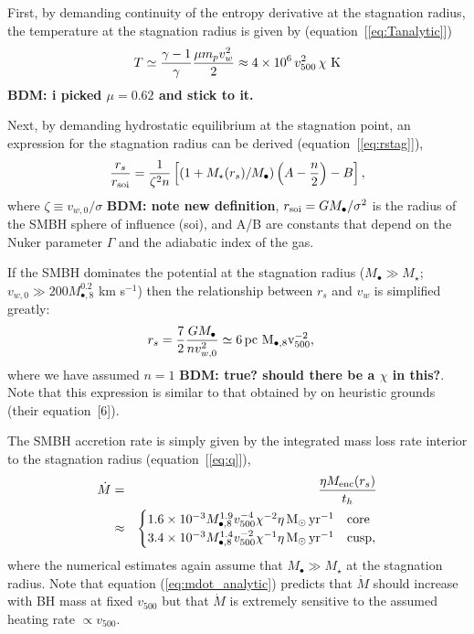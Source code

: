 \documentclass[usenatbib,fleqn]{mn2e}
\newcommand{\rs}{r_s}
\newcommand{\pc}{\rm pc}
\newcommand{\Menc}{M_{\rm enc}}
\newcommand{\Mstar}{M_{\star}}
\newcommand{\Mbh}[1][]{M_{\bullet#1}}
\newcommand{\Mbheight}{M_{\bullet,8}}
\newcommand{\soi}{\rm soi}
\newcommand{\rsoi}{r_{\soi}}
\newcommand{\vwO}{v_{w,0}}
\newcommand{\x}{\frac{r_s}{\rsoi}}
\newcommand{\pyear}{{\rm yr}^{-1}}
\renewcommand{\th}{t_h}
\begin{document}
First, by demanding continuity of the entropy derivative at the stagnation radius, the temperature at the stagnation radius is given by (equation~[\ref{eq:Tanalytic}])
\begin{align}
T \simeq \frac{\gamma-1}{\gamma}\frac{\mu m_p v_{w}^{2}}{2} \approx 4 \times 10^6\,v_{500}^2 \, \chi   \,\,{\rm K} 
\end{align}
{\bf BDM: i picked $\mu = 0.62$ and stick to it.}

Next, by demanding hydrostatic equilibrium at the stagnation point, an expression for the stagnation radius can be derived (equation~[\ref{eq:rstag}]),
\begin{align}
  \x=\frac{1}{\zeta^2 n}\left[ (1+\Mstar(\rs)/\Mbh)\left(A-\frac{n}{2}\right)-B\right],
  \label{eq:stag_analytic}
\end{align}
where $\zeta \equiv v_{w,0}/\sigma$ {\bf BDM: note new definition}, $r_{\rm soi} = GM_{\bullet}/\sigma^{2}$ is the radius of the SMBH sphere of influence (soi), and A/B are constants that depend on the Nuker parameter $\Gamma$ and the adiabatic index of the gas.  

If the SMBH dominates the potential at the stagnation radius
($M_{\bullet} \gg M_{\star}$; $v_{w,0} \gg 200 M_{\bullet,8}^{0.2}$ km
s$^{-1}$) then the relationship between $\rs$ and $v_{w}$ is
simplified greatly:
\begin{align}
  &\rs=\frac{7}{2}\frac{G \Mbh}{n \vwO^2} \simeq 6 \, \pc \,\, \Mbheight v_{500}^{-2},
  \label{eq:stag_simple}
\end{align}
where we have assumed $n = 1$ {\bf BDM: true?  should there be a
  $\chi$ in this?}.  Note that this expression is similar to that
obtained by \citet{Volonteri+11} on heuristic grounds (their equation~[6]).

The SMBH accretion rate is simply given by the integrated mass loss rate interior to the stagnation radius (equation~[\ref{eq:q}]), 
\begin{eqnarray}
  \dot{M} &=& \frac{\eta \Menc(\rs)}{\th} \nonumber \\
&\approx&
  \begin{cases}
    1.6 \times 10^{-3}  M_{\bullet,8}^{1.9}
    v_{500}^{-4} \chi^{-2} \eta \Msun \, \pyear& \text{core} \\
    3.4 \times 10^{-3} \Mbheight^{1.4}
    v_{500}^{-2} \chi^{-1} \eta \Msun \, \pyear  & \text{cusp}, 
  \end{cases}
  \label{eq:mdot_analytic}
\end{eqnarray}
where the numerical estimates again assume that $M_{\bullet} \gg M_{\star}$ at the stagnation radius.  Note that equation (\ref{eq:mdot_analytic}) predicts that $\dot{M}$ should increase with BH mass at fixed $v_{500}$ but that $\dot{M}$ is extremely sensitive to the assumed heating rate $\propto v_{500}$.
\end{document}
